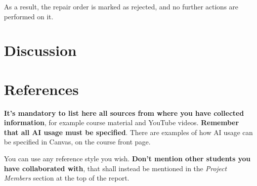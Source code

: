\documentclass[a4paper]{scrartcl}
\begin{document}
As a result, the repair order is marked as rejected, and no further actions are performed on it.

\section{Discussion}


\section*{References}

\textbf{It's mandatory to list here all sources from where you have collected information}, for example course material and YouTube videos. \textbf{Remember that all AI usage must be specified}. There are examples of how AI usage can be specified in Canvas, on the course front page.

You can use any reference style you wish. \textbf{Don't mention other students you have collaborated with}, that shall instead be mentioned in the \textit{Project Members} section at the top of the report.
\end{document}
